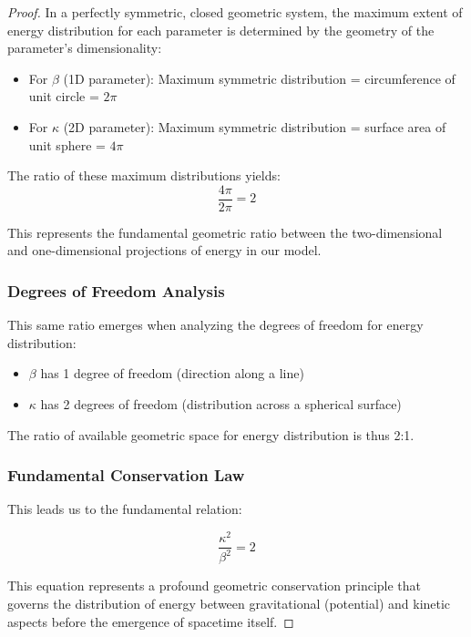 \documentclass{article}
\begin{document}
\begin{theorem}
\begin{proof}
In a perfectly symmetric, closed geometric system, the maximum extent of energy distribution for each parameter is determined by the geometry of the parameter's dimensionality:

\begin{itemize}
    \item For $\beta$ (1D parameter): Maximum symmetric distribution = circumference of unit circle = $2\pi$
    \item For $\kappa$ (2D parameter): Maximum symmetric distribution = surface area of unit sphere = $4\pi$
\end{itemize}

The ratio of these maximum distributions yields:
\begin{equation}
\frac{4\pi}{2\pi} = 2
\end{equation}

This represents the fundamental geometric ratio between the two-dimensional and one-dimensional projections of energy in our model.

\subsubsection{Degrees of Freedom Analysis}

This same ratio emerges when analyzing the degrees of freedom for energy distribution:
\begin{itemize}
    \item $\beta$ has 1 degree of freedom (direction along a line)
    \item $\kappa$ has 2 degrees of freedom (distribution across a spherical surface)
\end{itemize}

The ratio of available geometric space for energy distribution is thus 2:1.

\subsubsection{Fundamental Conservation Law}

This leads us to the fundamental relation:

\begin{equation}
\boxed{\frac{\kappa^2}{\beta^2} = 2}
\end{equation}

This equation represents a profound geometric conservation principle that governs the distribution of energy between gravitational (potential) and kinetic aspects before the emergence of spacetime itself.


\end{proof}
\end{theorem}
\end{document}
